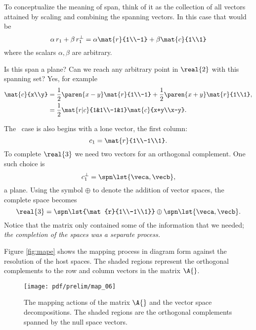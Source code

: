 To conceptualize the meaning of span, think of it as the collection of all vectors attained by scaling and combining the spanning vectors. In this case that would be
\begin{equation}
 \alpha\, r_{1} + \beta\, r_{1}^{\perp} = \alpha \mat{r}{1\\-1} + \beta \mat{c}{1\\1}
\end{equation}
where the scalars $\alpha, \beta$ are arbitrary.

Is this span a plane? Can we reach any arbitrary point in $\real{2}$ with this spanning set? Yes, for example
\begin{equation}
  \begin{split}
    \mat{c}{x\\y} &= \frac{1}{2}\paren{x-y}\mat{r}{1\\-1} + \frac{1}{2}\paren{x+y}\mat{r}{1\\1},\\
    &= \frac{1}{2}\mat{r|c}{1&1\\-1&1}\mat{c}{x+y\\x-y}.
  \end{split}
\end{equation}

The \vvv \ case is also begins with a lone vector, the first column:
\begin{equation}
  c_{1} = \mat{r}{1\\-1\\1}.
\end{equation}
To complete $\real{3}$ we need two vectors for an orthogonal complement. One such choice is
\begin{equation}
  c_{1}^{\perp} = \spn \lst{\veca,\vecb},
\end{equation}
a plane.
Using the symbol $\oplus$ to denote the addition of vector spaces, the complete space becomes
\begin{equation}
  \real{3} = \spn \lst{\mat{r}{1\\-1\\1}} \oplus \spn \lst{\veca,\vecb}.
\end{equation}
Notice that the matrix only contained some of the information that we needed; \textit{the completion of the spaces was a separate process.}

Figure \eqref{fig:mape} shows the mapping process in diagram form against the resolution of the host spaces. The shaded regions represent the orthogonal complements to the row and column vectors in the matrix $\A{}$.
\begin{figure}[htbp] %
   \centering
   \texttt{[image: pdf/prelim/map\_06]} 
   \caption[The mapping actions of the matrix $\A{}$ and the vector space decompositions]{The mapping actions of the matrix $\A{}$ and the vector space decompositions. The shaded regions are the orthogonal complements spanned by the null space vectors.}
   \label{fig:mape}
\end{figure}


